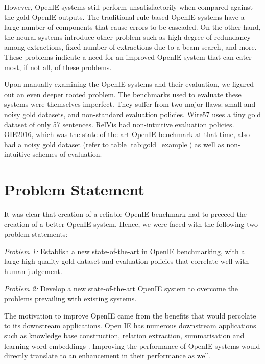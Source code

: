   However, OpenIE systems still perform unsatisfactorily when compared against the gold OpenIE outputs. The traditional rule-based OpenIE systems have a large number of components that cause errors to be cascaded. On the other hand, the neural systems introduce other problem such as high degree of redundancy among extractions, fixed number of extractions due to a beam search, and more. These problems indicate a need for an improved OpenIE system that can cater most, if not all, of these problems.
  
  Upon manually examining the OpenIE systems and their evaluation, we figured out an even deeper rooted problem. The benchmarks used to evaluate these systems were themselves imperfect. They suffer from two major flaws: small and noisy gold datasets, and non-standard evaluation policies. Wire57 \citep{Wire57} uses a tiny gold dataset of only 57 sentences. RelVis had non-intuitive evaluation policies. OIE2016, which was the state-of-the-art OpenIE benchmark at that time, also had a noisy gold dataset (refer to table \ref{tab:gold_example}) as well as non-intuitive schemes of evaluation.

\section{Problem Statement}

  It was clear that creation of a reliable OpenIE benchmark had to preceed the creation of a better OpenIE system. Hence, we were faced with the following two problem statements:

  \textit{Problem 1:} Establish a new state-of-the-art in OpenIE benchmarking, with a large high-quality gold dataset and evaluation policies that correlate well with human judgement.

  \textit{Problem 2:} Develop a new state-of-the-art OpenIE system to overcome the problems prevailing with existing systems.
  
  The motivation to improve OpenIE came from the benefits that would percolate to its downstream applications. Open IE has numerous downstream applications such as knowledge base construction, relation extraction, summarisation and learning word embeddings \citep{embedding,survey}. Improving the performance of OpenIE systems would directly translate to an enhancement in their performance as well.


